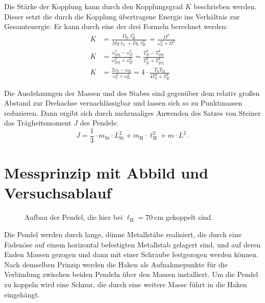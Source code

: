 \documentclass[
12pt,
a4paper,
bibliography=totocnumbered, %
BCOR=1cm, %
oneside, %
]{scrartcl}
\newcommand{\lh}{\ell_{\mathrm{H}}}
\newcommand{\ls}{\ell_{\mathrm{S}}}
\begin{document}
Die Stärke der Kopplung kann durch den Kopplungsgrad \(K\) beschrieben werden. Dieser setzt die durch die Kopplung übertragene Energie ins Verhältnis zur Gesamtenergie. Er kann durch eine der drei Formeln berechnet werden:
\begin{align}
	K &= \frac{D_{\text{F}} \ell_{\text{H}}^2}{Mg \ls + D_{\text{F}} \ell_{\text{H}}^2} = \frac{\Omega^2}{\omega_0^2 + \Omega^2}\label{eq:1}\\
	K &= \frac{\omega_{\text{geg}}^2 - \omega_{\text{gl}}^2}{\omega_{\text{geg}}^2 + \omega_{\text{gl}}^2} = \frac{T_{\text{gl}}^2 - T_{\text{geg}}^2}{T_{\text{gl}}^2 + T_{\text{geg}}^2}\label{eq:2}\\
	K &= \frac{2\omega_{\text{I}} - \omega_{\text{II}}}{\omega_{\text{I}}^2 + \omega_{\text{II}}^2} = 4\cdot\frac{T_{\text{S}} T_{\text{II}}}{4T_{\text{S}}^2 + T_{\text{II}}^2} \label{eq:3}
\end{align}

Die Ausdehnungen der Massen und des Stabes sind gegenüber dem relativ großen Abstand zur Drehachse vernachlässigbar und lassen sich so zu Punktmassen reduzieren. Dann ergibt sich durch mehrmaliges Anwenden des Satzes von Steiner das Trägheitsmoment \(J\) des Pendels:
\begin{equation}\label{eq:trägheitsmom}
	J=\frac{1}{3} \cdot m_{\text{St}} \cdot L_{\text{St}}^2 + m_{\text{H}} \cdot \lh^2 + m \cdot L^2 \,.
\end{equation}

\section[Messprinzip]{Messprinzip mit Abbild und Versuchsablauf}

\begin{figure}[H]
	\caption{Aufbau der Pendel, die hier bei \(\lh = \qty{70}{\centi\meter}\) gekoppelt sind.}
	\label{fig:aufbau}
\end{figure}

Die Pendel werden durch lange, dünne Metallstäbe realisiert, die durch eine Fadenöse auf einem horizontal befestigten Metallstab gelagert sind, und auf deren Enden Massen gezogen und dann mit einer Schraube festgezogen werden können. Nach demselben Prinzip werden die Haken als Aufnahmepunkte für die Verbindung zwischen beiden Pendeln über den Massen installiert. Um die Pendel zu koppeln wird eine Schnur, die durch eine weitere Masse führt in die Haken eingehängt.
\end{document}
